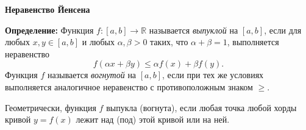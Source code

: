 \documentclass{article}
\begin{document}
    \large

    \begin{center}
        \textbf{Неравенство Йенсена}
    \end{center}

    \textbf{Определение:}
    Функция $f : [a, b] \rightarrow \mathbb{R}$ называется \emph{выпуклой} на $[a, b]$, если для любых $x, y \in [a, b]$ и любых $\alpha, \beta > 0$ таких, что $\alpha + \beta = 1$, выполняется неравенство
    \[
        f(\alpha x + \beta y) \leq \alpha f(x) + \beta f(y).
    \]
    Функция $f$ называется \emph{вогнутой} на $[a, b]$, если при тех же условиях выполняется аналогичное неравенство с противоположным знаком $\geqslant$.

    Геометрически, функция $f$ выпукла (вогнута), если любая точка любой хорды кривой $y = f(x)$ лежит над (под) этой кривой или на ней.
\end{document}
